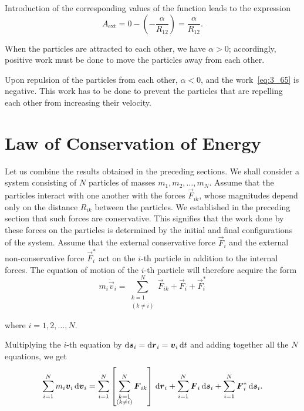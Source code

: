 \noindent
Introduction of the corresponding values of the function  leads to the expression
\begin{equation}\label{eq:3_65}
A_{\text{ext}} = 0 - \left(-\frac{\alpha}{R_{12}}\right) = \frac{\alpha}{R_{12}}.
\end{equation}

When the particles are attracted to each other, we have $\alpha>0$; accordingly, positive work must be done to move the particles away from each other.

Upon repulsion of the particles from each other, $\alpha<0$, and the work~\eqref{eq:3_65} is negative. This work has to be done to prevent the particles that are repelling each other from increasing their velocity.


\section{Law of Conservation of Energy}\label{sec:3_7}

Let us combine the results obtained in the preceding sections. We shall consider a system consisting of $N$ particles of masses $m_1, m_2, \ldots, m_N$. Assume that the particles interact with one another with the forces $\vec{F}_{ik}$, whose magnitudes depend only on the distance $R_{ik}$ between the particles. We established in the preceding section that such forces are conservative. This signifies that the work done by these forces on the particles is determined by the initial and final configurations of the system. Assume that the external conservative force $\vec{F}_i$ and the external non-conservative force $\vec{F}_i^*$ act on the $i$-th particle in addition to the internal forces. The equation of motion of the $i$-th particle will therefore acquire the form
\begin{equation}\label{eq:3_66}
m_i\dot{\vec{v}}_i = \sum_{\substack{k=1\\(k\neq i)}}^{N} \vec{F}_{ik} + \vec{F}_i + \vec{F}_i^*
\end{equation}

\noindent
where $i=1,2,\ldots,N$.

Multiplying the $i$-th equation by $\mathrm{d}\boldsymbol{s}_i=\mathrm{d}\boldsymbol{r}_i=\boldsymbol{v}_i\,\mathrm{d} t$ and adding together all the $N$ equations, we get
\begin{equation}\label{eq:3_67}
\sum_{i=1}^{N} m_i\boldsymbol{v}_i\,\mathrm{d}\boldsymbol{v}_i = \sum_{i=1}^{N}\left[\sum_{\substack{k=1\\(k\neq i)}}^{N} \boldsymbol{F}_{ik}\right]\,\mathrm{d}\boldsymbol{r}_i + \sum_{i=1}^{N}\boldsymbol{F}_i\,\mathrm{d}\boldsymbol{s}_i + \sum_{i=1}^{N}\boldsymbol{F}_i^*\,\mathrm{d}\boldsymbol{s}_i.
\end{equation}

